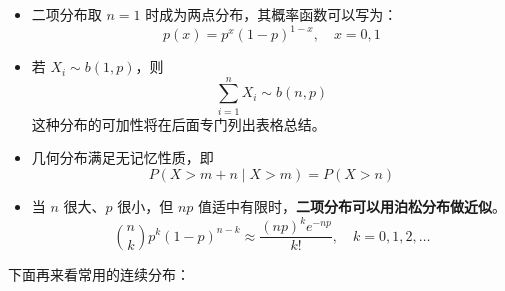 \documentclass[a4paper]{ctexart}
\begin{document}
        \begin{tipbox}
            \begin{itemize}
                \item 二项分布取 $n=1$ 时成为两点分布，其概率函数可以写为：
                \[
                p(x) = p^x (1-p)^{1-x}, \quad x = 0, 1
                \]
                
                \item 若 $X_i \sim b(1, p)$，则
                \[
                \sum_{i=1}^n X_i \sim b(n, p)
                \]
                这种分布的可加性将在后面专门列出表格总结。
                
                \item 几何分布满足无记忆性质，即
                \[
                P(X > m + n \mid X > m) = P(X > n)
                \]
                
                \item 当 $n$ 很大、$p$ 很小，但 $np$ 值适中有限时，\textbf{二项分布可以用泊松分布做近似}。
                \[
                \binom{n}{k} p^k (1-p)^{n-k} \approx \frac{(np)^k e^{-np}}{k!}, \quad k = 0, 1, 2, \dots
                \]
            \end{itemize}
        \end{tipbox}
        下面再来看常用的连续分布：
\end{document}
